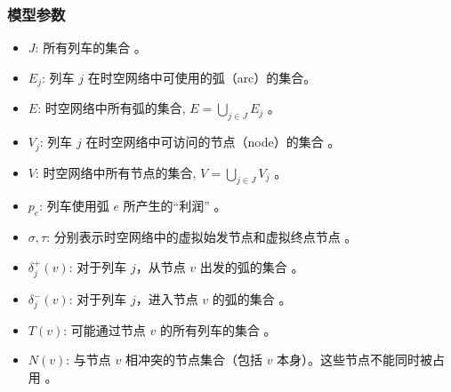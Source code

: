 \documentclass{article}
\begin{document}
    \subsubsection{模型参数}
    \begin{itemize}
        \item $J$: 所有列车的集合 。
        \item $E_j$: 列车 $j$ 在时空网络中可使用的弧（arc）的集合。
        \item $E$: 时空网络中所有弧的集合, $E = \bigcup_{j \in J} E_j$ 。
        \item $V_j$: 列车 $j$ 在时空网络中可访问的节点（node）的集合 。
        \item $V$: 时空网络中所有节点的集合, $V = \bigcup_{j \in J} V_j$ 。
        \item $p_e$: 列车使用弧 $e$ 所产生的“利润” 。
        \item $\sigma, \tau$: 分别表示时空网络中的虚拟始发节点和虚拟终点节点 。
        \item $\delta_j^+(v)$: 对于列车 $j$，从节点 $v$ 出发的弧的集合 。
        \item $\delta_j^-(v)$: 对于列车 $j$，进入节点 $v$ 的弧的集合 。
        \item $T(v)$: 可能通过节点 $v$ 的所有列车的集合 。
        \item $N(v)$: 与节点 $v$ 相冲突的节点集合（包括 $v$ 本身）。这些节点不能同时被占用 。
    \end{itemize}
\end{document}
